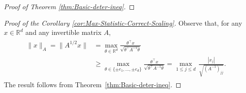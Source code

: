 \documentclass[11pt]{article}
\begin{document}
\begin{appendices}
\begin{proof}[Proof of Theorem \ref{thm:Basic-deter-ineq}]
\end{proof}

\begin{proof}[Proof of the Corollary \ref{cor:Max-Statistic-Correct-Scaling}]
Observe that, for any $x\in\mathbb{R}^{d}$ and any invertible matrix $A$,
\begin{align}\label{eq:Scaled-Euclidean-Maximum-Comparison}
\begin{split}
\|x\|_A = \|A^{1/2}x\| &= \max_{\theta\in\mathbb{R}^{d}}\frac{\theta^{\top}x}{\sqrt{\theta^{\top}A^{-1}\theta}}\\ &\geq \max_{\theta \in \{ \pm e_1,\ldots,\pm e_d \}} \frac{\theta^{\top}x}{\sqrt{\theta^{\top}A^{-1}\theta}} = \max_{1\le j\le d}\,\frac{|x_j|}{\sqrt{(A^{-1})_{jj}}}.%
\end{split}
\end{align}
The result follows from Theorem~\ref{thm:Basic-deter-ineq}.
\end{proof}



\end{appendices}
\end{document}
